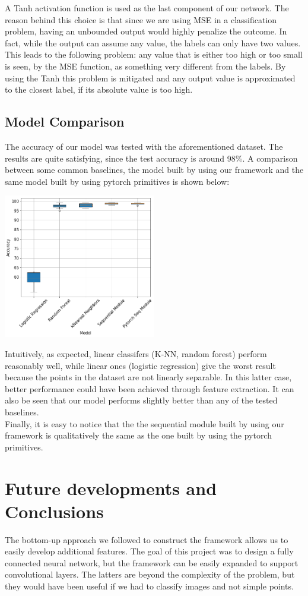 \documentclass[10pt,conference,compsocconf]{IEEEtran}
\begin{document}
A Tanh activation function is used as the last component of our network. The reason behind this choice is that since we are using MSE in a classification problem, having an unbounded output would highly penalize the outcome. In fact, while the output can assume any value, the labels can only have two values. This leads to the following problem: any value that is either too high or too small is seen, by the MSE function, as something very different from the labels. 
By using the Tanh this problem is mitigated and any output value is approximated to the closest label, if its absolute value is too high.

\subsection{Model Comparison}
The accuracy of our model was tested with the aforementioned dataset. The results are quite satisfying, since the test accuracy is around 98\%.
A comparison between some common baselines, the model built by using our framework and the same model built by using pytorch primitives is shown below:
\begin{center}
	\captionsetup{type=figure}
	\includegraphics[width=0.5\textwidth]{img/boxplots_final.png}
	\label{fig:boxplot}
\end{center} 
Intuitively, as expected, linear classifers (K-NN, random forest) perform
reasonably well, while linear ones (logistic regression) give the worst result
because the points in the dataset are not linearly separable. In this latter case,
better performance could have been achieved through feature extraction.
It can also be seen that our model performs slightly better than any of the tested
baselines.\\
Finally, it is easy to notice that the the sequential module built by using our framework is qualitatively the same as the one built by using the pytorch primitives.
\section{Future developments and Conclusions}
The bottom-up approach we followed to construct the framework allows us to easily develop additional features. The goal of this project was to design a fully connected neural network, but the framework can be easily expanded to support convolutional layers. The latters are beyond the complexity of the problem, but they would have been useful if we had to classify images and not simple points.
\end{document}
